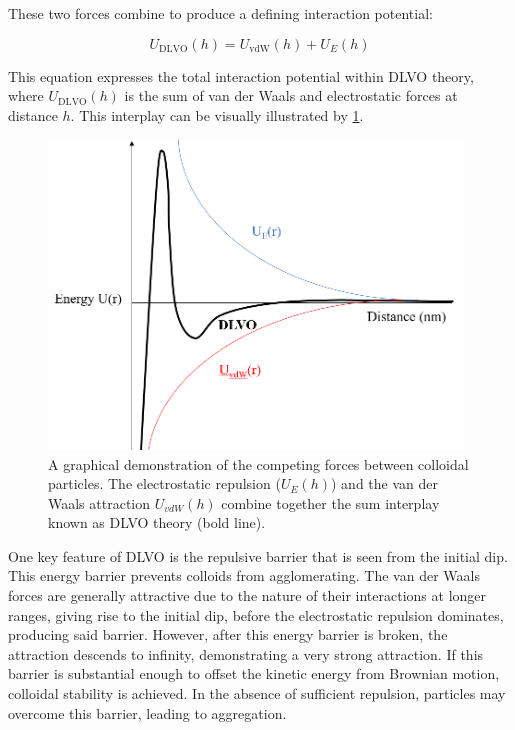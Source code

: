 These two forces combine to produce a defining interaction potential:

\begin{equation}
U_{\text{DLVO}}(h) = U_{\text{vdW}}(h) + U_{E}(h)
\end{equation}

This equation expresses the total interaction potential within DLVO theory, where \( U_{\text{DLVO}}(h) \) is the sum of van der Waals and electrostatic forces at distance \( h \). This interplay can be visually illustrated by \ref{fig:DLVO}.


\begin{figure}[h]     %
        \begin{center}
          \includegraphics[width=110mm]{chapter1/DLVO.PNG}
\end{center}
\caption{A graphical demonstration of the competing forces between colloidal particles. The electrostatic repulsion ($U_E(h)$) and the van der Waals attraction $U_{vdW}(h)$ combine together the sum interplay known as DLVO theory (bold line).}
\label{fig:DLVO}                 %
\end{figure}

One key feature of DLVO is the repulsive barrier that is seen from the initial dip. This energy barrier prevents colloids from agglomerating. The van der Waals forces are generally attractive due to the nature of their interactions at longer ranges, giving rise to the initial dip, before the electrostatic repulsion dominates, producing said barrier. However, after this energy barrier is broken, the attraction descends to infinity, demonstrating a very strong attraction. If this barrier is substantial enough to offset the kinetic energy from Brownian motion, colloidal stability is achieved. In the absence of sufficient repulsion, particles may overcome this barrier, leading to aggregation.

